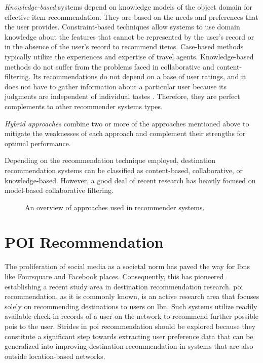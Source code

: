 \textit{Knowledge-based} systems \parencite{Burke2000Knowledge-basedSystems} depend on knowledge models of the object domain for effective item recommendation. They are based on the needs and preferences that the user provides. Constraint-based techniques \parencite{Choi2021ATourismcity} allow systems to use domain knowledge about the features that cannot be represented by the user's record or in the absence of the user's record to recommend items. Case-based methods \parencite{Montejo-Raez2011Otium:Leisure} typically utilize the experiences and expertise of travel agents. Knowledge-based methods do not suffer from the problems faced in collaborative and content-filtering. Its recommendations do not depend on a base of user ratings, and it does not have to gather information about a particular user because its
judgments are independent of individual tastes  \parencite{Burke2000Knowledge-basedSystems}. Therefore, they are perfect complements to other recommender systems types. 

\textit{Hybrid approaches} \parencite{Adomavicius2005TowardExtensions,Ghazanfar2010BuildingFiltering} combine two or more of the approaches mentioned above to mitigate the weaknesses of each approach and complement their strengths for optimal performance. 

Depending on the recommendation technique employed, destination recommendation systems can be classified as content-based, collaborative, or knowledge-based. However,  a good deal of recent research has heavily focused on model-based collaborative filtering.


\begin{figure}[htpb]
  \centering
   
    \caption[Recommender Systems Approaches Overview]{An overview of approaches used in recommender systems.}\label{fig:recSystems-approaches}
\end{figure}

\section{POI Recommendation}
The proliferation of social media as a societal norm has paved the way for \Glspl{lbn} like Foursquare and Facebook places. Consequently, this has pioneered establishing a recent study area in destination recommendation research. \gls{poi} recommendation, as it is commonly known, is an active research area that focuses solely on recommending destinations to users on \gls{lbn}. Such systems utilize readily available check-in records of a user on the network to recommend further possible \glspl{poi} to the user. Strides in \gls{poi} recommendation should be explored because they constitute a significant step towards extracting user preference data that can be generalized into improving destination recommendation in systems that are also outside location-based networks.

